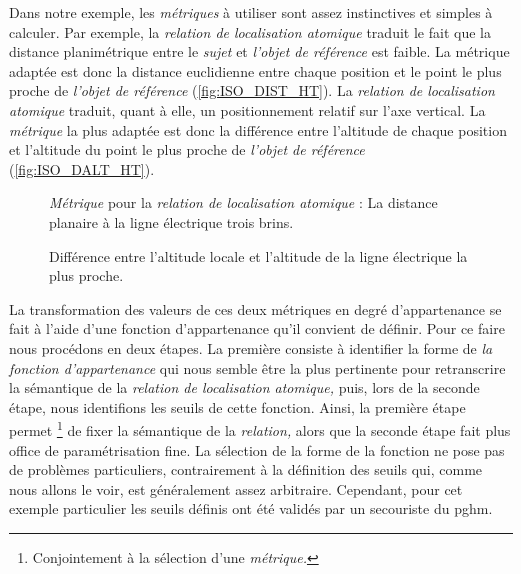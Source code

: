 Dans notre exemple, les \emph{métriques} à utiliser sont assez
instinctives et simples à calculer. Par exemple, la \emph{relation de
  localisation atomique}  traduit le fait que la
distance planimétrique entre le \emph{sujet} et \emph{l'objet de
  référence} est faible. La métrique adaptée est donc la distance
euclidienne entre chaque position et le point le plus proche de
\emph{l'objet de référence} (\autoref{fig:ISO_DIST_HT}). La
\emph{relation de localisation atomique}
 traduit,
quant à elle, un positionnement relatif sur l'axe vertical. La
\emph{métrique} la plus adaptée est donc la différence entre
l'altitude de chaque position et l'altitude du point le plus proche de
\emph{l'objet de référence} (\autoref{fig:ISO_DALT_HT}).

\begin{figure}
  \centering
  
  \caption{\emph{Métrique} pour la \emph{relation de localisation
      atomique}
    \protect{}
    : La distance planaire à la ligne électrique trois brins.}
  \label{fig:ISO_DIST_HT}
\end{figure}

\begin{figure}
  \centering
  
  \caption{Différence entre l'altitude locale et l'altitude de la
    ligne électrique la plus proche.}
  \label{fig:ISO_DALT_HT}
\end{figure}

La transformation des valeurs de ces deux métriques en degré
d'appartenance se fait à l'aide d'une fonction d'appartenance qu'il
convient de définir. Pour ce faire nous procédons en deux étapes. La
première consiste à identifier la forme de \emph{la fonction
  d'appartenance} qui nous semble être la plus pertinente pour
retranscrire la sémantique de la \emph{relation de localisation
  atomique,} puis, lors de la seconde étape, nous identifions les
seuils de cette fonction. Ainsi, la première étape permet
\footnote{Conjointement à la sélection d'une \emph{métrique.}} de
fixer la sémantique de la \emph{relation,} alors que la seconde étape
fait plus office de paramétrisation fine. La sélection de la forme de
la fonction ne pose pas de problèmes particuliers, contrairement à la
définition des seuils qui, comme nous allons le voir, est généralement
assez arbitraire. Cependant, pour cet exemple particulier les seuils
définis ont été validés par un secouriste du \ac{pghm}.

